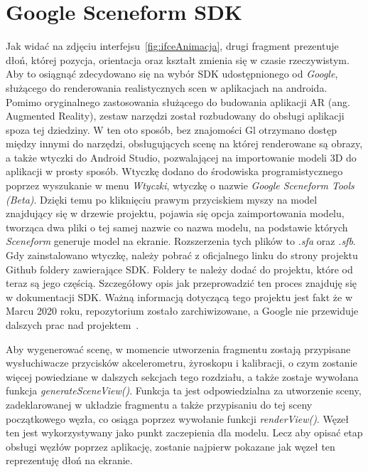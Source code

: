 \section{Google Sceneform SDK}
\label{sec:sceneform}
Jak widać na zdjęciu interfejsu~\ref{fig:ifceAnimacja}, drugi fragment prezentuje dłoń, której pozycja, orientacja oraz kształt zmienia się w czasie rzeczywistym. Aby to osiągnąć zdecydowano się na wybór SDK udostępnionego od \textit{Google}, służącego do renderowania realistycznych scen w aplikacjach na androida. Pomimo oryginalnego zastosowania służącego do budowania aplikacji AR (ang. Augmented Reality), zestaw narzędzi został rozbudowany do obsługi aplikacji spoza tej dziedziny. W ten oto sposób, bez znajomości Gl otrzymano dostęp między innymi do narzędzi, obsługujących scenę na której renderowane są obrazy, a także wtyczki do Android Studio, pozwalającej na importowanie modeli 3D do aplikacji w prosty sposób. Wtyczkę dodano do środowiska programistycznego poprzez wyszukanie w menu \textit{Wtyczki}, wtyczkę o nazwie \textit{Google Sceneform Tools (Beta)}. Dzięki temu po kliknięciu prawym przyciskiem myszy na model znajdujący się w drzewie projektu, pojawia się opcja zaimportowania modelu, tworząca dwa pliki o tej samej nazwie co nazwa modelu, na podstawie których \textit{Sceneform} generuje model na ekranie. Rozszerzenia tych plików to \textit{.sfa} oraz \textit{.sfb}. Gdy zainstalowano wtyczkę, należy pobrać z oficjalnego linku do strony projektu Github foldery zawierające SDK. Foldery te należy dodać do projektu, które od teraz są jego częścią. Szczegółowy opis jak przeprowadzić ten proces znajduję się w dokumentacji SDK. Ważną informacją dotyczącą tego projektu jest fakt że w Marcu 2020 roku, repozytorium zostało zarchiwizowane, a Google nie przewiduje dalszych prac nad projektem~\cite{sceneform}.

Aby wygenerować scenę, w momencie utworzenia fragmentu zostają przypisane wysłuchiwacze przycisków akcelerometru, żyroskopu i kalibracji, o czym zostanie więcej powiedziane w dalszych sekcjach tego rozdziału, a także zostaje wywołana funkcja \textit{generateSceneView()}. Funkcja ta jest odpowiedzialna za utworzenie sceny, zadeklarowanej w układzie fragmentu a także przypisaniu do tej sceny początkowego węzła, co osiąga poprzez wywołanie funkcji \textit{renderView()}. Węzeł ten jest wykorzystywany jako punkt zaczepienia dla modelu. Lecz aby opisać etap obsługi węzłów poprzez aplikację, zostanie najpierw pokazane jak węzeł ten reprezentuję dłoń na ekranie.
